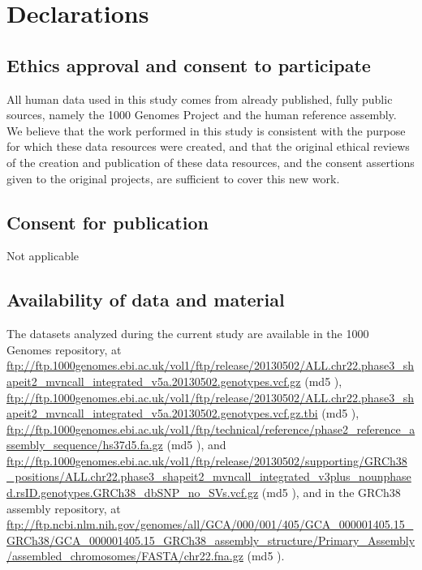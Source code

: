 \section{Declarations}

\subsection{Ethics approval and consent to participate}
All human data used in this study comes from already published, fully public sources, namely the 1000 Genomes Project and the human reference assembly. We believe that the work performed in this study is consistent with the purpose for which these data resources were created, and that the original ethical reviews of the creation and publication of these data resources, and the consent assertions given to the original projects, are sufficient to cover this new work.

\subsection{Consent for publication}
Not applicable

\subsection{Availability of data and material}
\begin{sloppypar}
The datasets analyzed during the current study are available in the 1000 Genomes repository, at \url{ftp://ftp.1000genomes.ebi.ac.uk/vol1/ftp/release/20130502/ALL.chr22.phase3_shapeit2_mvncall_integrated_v5a.20130502.genotypes.vcf.gz} (md5 ), \url{ftp://ftp.1000genomes.ebi.ac.uk/vol1/ftp/release/20130502/ALL.chr22.phase3_shapeit2_mvncall_integrated_v5a.20130502.genotypes.vcf.gz.tbi} (md5 ), \url{ftp://ftp.1000genomes.ebi.ac.uk/vol1/ftp/technical/reference/phase2_reference_assembly_sequence/hs37d5.fa.gz} (md5 ), and \url{ftp://ftp.1000genomes.ebi.ac.uk/vol1/ftp/release/20130502/supporting/GRCh38_positions/ALL.chr22.phase3_shapeit2_mvncall_integrated_v3plus_nounphased.rsID.genotypes.GRCh38_dbSNP_no_SVs.vcf.gz} (md5 ), and in the GRCh38 assembly repository, at \url{ftp://ftp.ncbi.nlm.nih.gov/genomes/all/GCA/000/001/405/GCA_000001405.15_GRCh38/GCA_000001405.15_GRCh38_assembly_structure/Primary_Assembly/assembled_chromosomes/FASTA/chr22.fna.gz} (md5 ).
\end{sloppypar}

